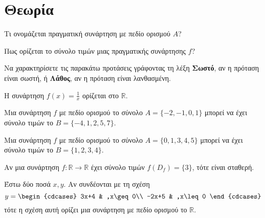 \documentclass[11pt,a4paper,twocolumn]{article}
\begin{document}
\section{Θεωρία}
\begin{askhseis}
\item Τι ονομάζεται πραγματική συνάρτηση με πεδίο ορισμού $A$?
\item Πως ορίζεται το σύνολο τιμών μιας πραγματικής συνάρτησης $f$?
\item Να χαρακτηρίσετε τις παρακάτω προτάσεις γράφοντας τη λέξη \textbf{Σωστό}, αν η πρόταση είναι σωστή, ή \textbf{Λάθος}, αν η πρόταση είναι λανθασμένη.
\begin{alist}
\item Η συνάρτηση $f(x)=\frac{1}{x}$ ορίζεται στο $\mathbb{R}$.
\item Μια συνάρτηση $f$ με πεδίο ορισμού το σύνολο $A=\{-2,-1,0,1\}$ μπορεί να έχει σύνολο τιμών το $B=\{-4,1,2,5,7\}$.
\item Μια συνάρτηση $f$ με πεδίο ορισμού το σύνολο $A=\{0,1,3,4,5\}$ μπορεί να έχει σύνολο τιμών το $B=\{1,2,3,4\}$.
\item Αν μια συνάρτηση $f:\mathbb{R}\to\mathbb{R}$ έχει σύνολο τιμών $f(D_f)=\{3\}$, τότε είναι σταθερή.
\item Έστω δύο ποσά $x,y$. Αν συνδέονται με τη σχέση
\[ y=\begin{cdcases}
3x+4 & ,x\geq 0\\ -2x+5 & ,x\leq 0
\end{cdcases} \]
τότε η σχέση αυτή ορίζει μια συνάρτηση με πεδίο ορισμού το $\mathbb{R}$.
\end{alist}
\end{askhseis}
\end{document}

